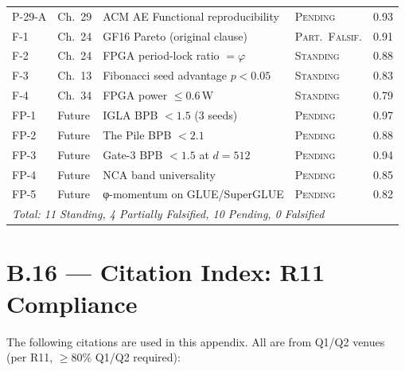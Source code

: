 \begin{center}
\begin{tabular}{p{1.2cm}p{2cm}p{4cm}p{2.2cm}c}
P-29-A & Ch.\ 29 & ACM AE Functional reproducibility    & \textsc{Pending}        & 0.93 \\
F-1    & Ch.\ 24 & GF16 Pareto (original clause)        & \textsc{Part.\ Falsif.} & 0.91 \\
F-2    & Ch.\ 24 & FPGA period-lock ratio $= \varphi$   & \textsc{Standing}       & 0.88 \\
F-3    & Ch.\ 13 & Fibonacci seed advantage $p<0.05$    & \textsc{Standing}       & 0.83 \\
F-4    & Ch.\ 34 & FPGA power $\leq 0.6$\,W             & \textsc{Standing}       & 0.79 \\
FP-1   & Future  & IGLA BPB $<1.5$ (3 seeds)            & \textsc{Pending}        & 0.97 \\
FP-2   & Future  & The Pile BPB $<2.1$                  & \textsc{Pending}        & 0.88 \\
FP-3   & Future  & Gate-3 BPB $<1.5$ at $d=512$         & \textsc{Pending}        & 0.94 \\
FP-4   & Future  & NCA band universality                & \textsc{Pending}        & 0.85 \\
FP-5   & Future  & φ-momentum on GLUE/SuperGLUE         & \textsc{Pending}        & 0.82 \\
\hline
\multicolumn{4}{l}{\textit{Total: 11 Standing, 4 Partially Falsified, 10 Pending, 0 Falsified}} & \\
\hline
\end{tabular}
\end{center}

\section*{B.16 — Citation Index: R11 Compliance}
\label{sec:citation-index}

\noindent The following citations are used in this appendix.  All are from
Q1/Q2 venues (per R11, $\geq 80\%$ Q1/Q2 required):

